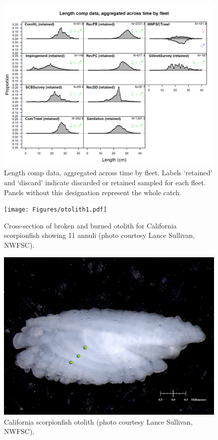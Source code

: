 \documentclass[12pt,]{article}
\begin{document}
\FloatBarrier

\begin{figure}[htbp]
\centering
\includegraphics{r4ss/plots_mod1/comp_lendat__aggregated_across_time.png}
\caption{Length comp data, aggregated across time by fleet. Labels
`retained' and `discard' indicate discarded or retained sampled for each
fleet. Panels without this designation represent the whole catch.
\label{fig:comp_lendat_aggregated_across_time}}
\end{figure}

\FloatBarrier

\begin{figure}[htbp]
\centering
\texttt{[image: Figures/otolith1.pdf]}
\caption{Cross-section of broken and burned otolith for California
scorpionfish showing 11 annuli (photo courtesy Lance Sullivan, NWFSC).
\label{fig:otolith1}}
\end{figure}

\begin{figure}[htbp]
\centering
\includegraphics{Figures/otolith2.pdf}
\caption{California scorpionfish otolith (photo courtesy Lance Sullivan,
NWFSC). \label{fig:otolith2}}
\end{figure}
\end{document}

